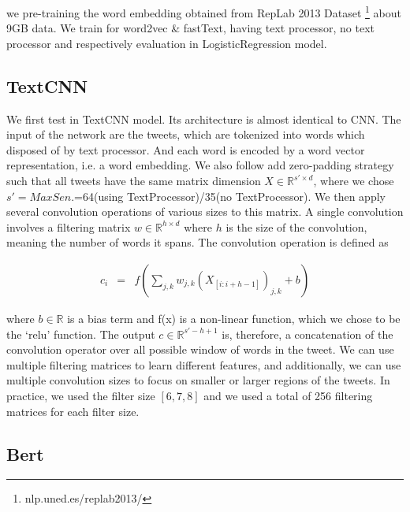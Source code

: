 we pre-training the word embedding obtained from RepLab 2013 Dataset \cite{replab2013overview}\footnote{nlp.uned.es/replab2013/} about 9GB data. We train for word2vec \& fastText, having text processor, no text processor and respectively evaluation in LogisticRegression model. 


\subsection{TextCNN}

We first test in TextCNN model.  Its architecture is almost identical to CNN.  The input of the network are the tweets, which are tokenized into words which disposed of by text processor.  And each word is encoded by a word vector representation, i.e. a word embedding.  We also follow add zero-padding strategy such that all tweets have the same matrix dimension $X \in \mathbb{R}^{s'\times d}$, where we chose $s'=MaxSen.$=64(using TextProcessor)/35(no TextProcessor).  We then apply several convolution operations of various sizes to this matrix.  A single convolution involves a filtering matrix $w \in \mathbb{R}^{h\times d}$ where $h$ is the size of the convolution, meaning the number of words it spans.  The convolution operation is defined as 

\begin{eqnarray}
c_i &=& f \left( \sum_{j,k} w_{j,k} \left(X_{[i:i+h-1]} \right)_{j,k} + b \right)
\end{eqnarray}

where $b \in \mathbb{R}$ is a bias term and f(x) is a non-linear function, which we chose to be the `relu' function.  The output $c \in \mathbb{R}^{s'-h+1}$ is, therefore, a concatenation of the convolution operator over all possible window of words in the tweet. We can use multiple filtering matrices to learn different features, and additionally, we can use multiple convolution sizes to focus on smaller or larger regions of the tweets.  In practice, we used the filter size $[6,7,8]$ and we used a total of 256 filtering matrices for each filter size.\\

\subsection{Bert}




